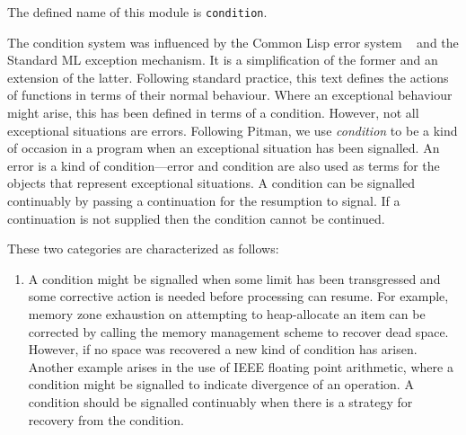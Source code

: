 %
\begin{optDefinition}
The defined name of this module is {\tt condition}.

The condition system was influenced by the Common Lisp error system
~  and the Standard
ML exception mechanism.  It is a simplification of
the former and an extension of the latter.  Following standard practice, this
text defines the actions of functions in terms of their normal behaviour.  Where
an exceptional behaviour might arise, this has been defined in terms of a
condition.  However, not all exceptional situations are errors.  Following
Pitman, we use {\em condition}  to be a kind of
occasion in a program when an exceptional situation has been signalled.  An
error is a kind of condition---error and condition are also used as terms for
the objects that represent exceptional situations.  A condition can be signalled
continuably by passing a continuation for the resumption to signal.  If a
continuation is not supplied then the condition cannot be continued.

\noindent
These two categories are characterized as follows:
\begin{enumerate}
    \item {} A condition might be signalled
    when some limit has been transgressed and some corrective action is needed
    before processing can resume.  For example, memory zone exhaustion on
    attempting to heap-allocate an item can be corrected by calling the memory
    management scheme to recover dead space.  However, if no space was recovered
    a new kind of condition has arisen.  Another example arises in the use of
    IEEE floating point arithmetic, where a condition might be signalled to
    indicate divergence of an operation.  A condition should be signalled
    continuably when there is a strategy for recovery from the condition.


\end{enumerate}
\end{optDefinition}
